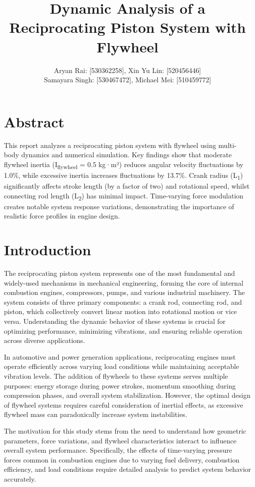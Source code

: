 \documentclass[10pt]{article}
\title{Dynamic Analysis of a Reciprocating Piston System with Flywheel}
\author{Aryan Rai: [530362258], Xin Yu Lin: [520456446] \\
        Samayara Singh: [530467472], Michael Mei: [510459772]}
\begin{document}
\maketitle

\section{Abstract}

This report analyzes a reciprocating piston system with flywheel using multi-body dynamics and numerical simulation. Key findings show that moderate flywheel inertia (I\textsubscript{flywheel} = 0.5 kg·m²) reduces angular velocity fluctuations by 1.0\%, while excessive inertia increases fluctuations by 13.7\%. Crank radius (L\textsubscript{1}) significantly affects stroke length (by a factor of two) and rotational speed, whilst connecting rod length (L\textsubscript{2}) has minimal impact. Time-varying force modulation creates notable system response variations, demonstrating the importance of realistic force profiles in engine design.

\section{Introduction}

The reciprocating piston system represents one of the most fundamental and widely-used mechanisms in mechanical engineering, forming the core of internal combustion engines, compressors, pumps, and various industrial machinery. The system consists of three primary components: a crank rod, connecting rod, and piston, which collectively convert linear motion into rotational motion or vice versa. Understanding the dynamic behavior of these systems is crucial for optimizing performance, minimizing vibrations, and ensuring reliable operation across diverse applications.

In automotive and power generation applications, reciprocating engines must operate efficiently across varying load conditions while maintaining acceptable vibration levels. The addition of flywheels to these systems serves multiple purposes: energy storage during power strokes, momentum smoothing during compression phases, and overall system stabilization. However, the optimal design of flywheel systems requires careful consideration of inertial effects, as excessive flywheel mass can paradoxically increase system instabilities.

The motivation for this study stems from the need to understand how geometric parameters, force variations, and flywheel characteristics interact to influence overall system performance. Specifically, the effects of time-varying pressure forces common in combustion engines due to varying fuel delivery, combustion efficiency, and load conditions require detailed analysis to predict system behavior accurately.
\end{document}
